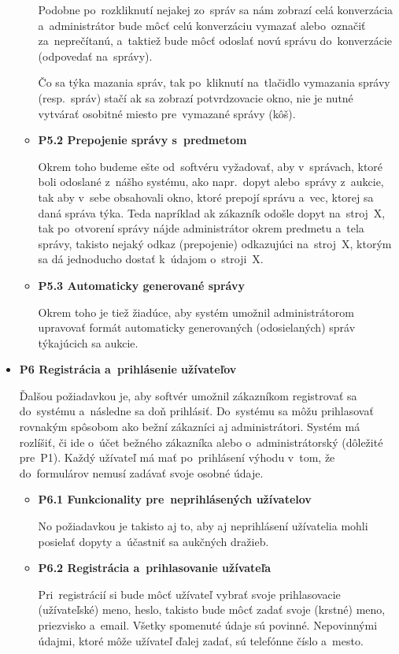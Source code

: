 \begin{itemize}
\begin{itemize}
Podobne po~rozkliknutí nejakej zo~správ sa nám zobrazí celá konverzácia a~administrátor bude môcť celú konverzáciu vymazať alebo~označiť za~neprečítanú, a~taktiež bude môcť odoslať novú správu do~konverzácie (odpovedať na~správy). 

Čo sa týka mazania správ, tak po~kliknutí na~tlačidlo vymazania správy (resp.~správ) stačí ak sa zobrazí potvrdzovacie okno, nie je nutné vytvárať osobitné miesto pre~vymazané správy (kôš). 

\item \textbf{P5.2 Prepojenie správy s~predmetom}

Okrem toho budeme ešte od~softvéru vyžadovať, aby v~správach, ktoré boli odoslané z~nášho systému, ako napr.~dopyt alebo~správy z~aukcie, tak aby v~sebe obsahovali okno, ktoré prepojí správu a~vec, ktorej sa daná správa týka. Teda napríklad ak zákazník odošle dopyt na~stroj~X, tak po~otvorení správy nájde administrátor okrem predmetu a~tela správy, takisto nejaký odkaz (prepojenie) odkazujúci na~stroj~X, ktorým sa dá jednoducho dostať k~údajom o~stroji~X.

\item \textbf{P5.3 Automaticky generované správy}

Okrem toho je tiež žiadúce, aby systém umožnil administrátorom upravovať formát automaticky generovaných (odosielaných) správ týkajúcich sa aukcie.
\end{itemize}

\item \textbf{P6 Registrácia a~prihlásenie užívateľov}

Ďalšou požiadavkou je, aby softvér umožnil zákazníkom registrovať sa do~systému a~následne sa doň prihlásiť. Do~systému sa môžu prihlasovať rovnakým spôsobom ako bežní zákazníci aj administrátori. Systém má rozlíšiť, či ide o~účet bežného zákazníka alebo o~administrátorský (dôležité pre~P1). Každý užívateľ má mať po~prihlásení výhodu v~tom, že do~formulárov nemusí zadávať svoje osobné údaje.

\begin{itemize}
\item \textbf{P6.1 Funkcionality pre~neprihlásených užívatelov}

No požiadavkou je takisto aj to, aby aj neprihlásení užívatelia mohli posielať dopyty a~účastniť sa aukčných dražieb.

\item \textbf{P6.2 Registrácia a~prihlasovanie užívateľa}

Pri~registrácií si bude môcť užívateľ vybrať svoje prihlasovacie (užívateľské) meno, heslo, takisto bude môcť zadať svoje (krstné) meno, priezvisko a~email. Všetky spomenuté údaje sú povinné. Nepovinnými údajmi, ktoré môže užívateľ ďalej zadať, sú telefónne číslo a~mesto.


\end{itemize}
\end{itemize}
